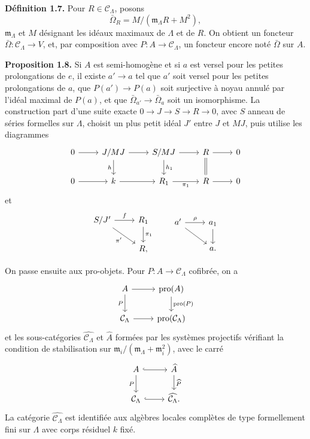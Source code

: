 \documentclass[11pt]{article}
\providecommand{\pro}{\operatorname{pro}}
\providecommand{\ma}{\mathfrak m_\Lambda}
\providecommand{\CL}{\mathcal C_\Lambda}
\begin{document}
\textbf{D\'efinition 1.7.} Pour $R\in\CL$, posons
\[
\bar\Omega_R=M/(\ma R+M^2),
\]
$\ma$ et $M$ d\'esignant les id\'eaux maximaux de $\Lambda$ et de $R$. On obtient un foncteur $\bar\Omega:\CL\to V$, et, par composition avec $P:A\to\CL$, un foncteur encore not\'e $\bar\Omega$ sur $A$.

\textbf{Proposition 1.8.} Si $A$ est semi-homog\`ene et si $a$ est versel pour les petites prolongations de $e$, il existe $a'\to a$ tel que $a'$ soit versel pour les petites prolongations de $a$, que $P(a')\to P(a)$ soit surjective \`a noyau annul\'e par l'id\'eal maximal de $P(a)$, et que $\bar\Omega_{a'}\to\bar\Omega_a$ soit un isomorphisme. La construction part d'une suite exacte $0\to J\to S\to R\to0$, avec $S$ anneau de s\'eries formelles sur $\Lambda$, choisit un plus petit id\'eal $J'$ entre $J$ et $MJ$, puis utilise les diagrammes
\[
\begin{tikzcd}
0 \arrow[r] & J/MJ \arrow[r] \arrow[d,"h"'] & S/MJ \arrow[r] \arrow[d,"h_1"] & R \arrow[r] \arrow[d,equal] & 0\\
0 \arrow[r] & k \arrow[r] & R_1 \arrow[r,"\pi_1"'] & R \arrow[r] & 0
\end{tikzcd}
\]
et
\[
\begin{tikzcd}
S/J' \arrow[r,"f"] \arrow[dr,"\pi'"'] & R_1 \arrow[d,"\pi_1"]\\
& R,
\end{tikzcd}
\qquad
\begin{tikzcd}
 a' \arrow[r,"\rho"] \arrow[dr] & a_1 \arrow[d]\\
& a .
\end{tikzcd}
\]

On passe ensuite aux pro-objets. Pour $P:A\to\CL$ cofibr\'ee, on a
\[
\begin{tikzcd}
 A \arrow[r] \arrow[d,"P"'] & \pro(A) \arrow[d,"\pro(P)"]\\
 \CL \arrow[r] & \pro(\CL)
\end{tikzcd}
\]
et les sous-cat\'egories $\widehat{\CL}$ et $\widehat A$ form\'ees par les syst\`emes projectifs v\'erifiant la condition de stabilisation sur $\mathfrak m_i/(\ma+\mathfrak m_i^2)$, avec le carr\'e
\[
\begin{tikzcd}
 A \arrow[r,hook] \arrow[d,"P"'] & \widehat A \arrow[d,"\widehat P"]\\
 \CL \arrow[r,hook] & \widehat{\CL}.
\end{tikzcd}
\]
La cat\'egorie $\widehat{\CL}$ est identifi\'ee aux alg\`ebres locales compl\`etes de type formellement fini sur $\Lambda$ avec corps r\'esiduel $k$ fix\'e.
\end{document}
